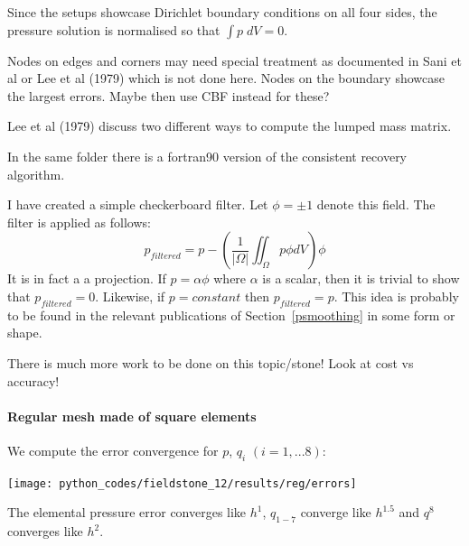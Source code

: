 Since the setups showcase Dirichlet boundary conditions on all four sides, 
the pressure solution is normalised so that $\int p\; dV =0 $.

\begin{remark}
Nodes on edges and corners may need special treatment as documented in Sani et al \cite{sagl81a} or
Lee et al (1979) \cite{legs79} which is not done here.  
Nodes on the boundary showcase the largest errors. Maybe then use CBF instead for these?
\end{remark}

\begin{remark}
Lee et al (1979) \cite{legs79} discuss two different ways to compute the lumped mass matrix. 
\end{remark}

\begin{remark}
In the same folder there is a fortran90 version of the consistent recovery algorithm.
\end{remark}

I have created a simple checkerboard filter. Let $\phi=\pm 1$ denote this field.
The filter is applied as follows:
\[
p_{filtered} = p - \left( \frac{1}{|\Omega|} \iint_\Omega p \phi dV \right) \phi
\]
It is in fact a a projection. If $p=\alpha \phi$  where $\alpha$ is a scalar, then 
it is trivial to show that $p_{filtered} =0$.
Likewise, if $p=constant$ then $p_{filtered}=p$.
This idea is probably to be found in the relevant publications of Section~\ref{psmoothing}
in some form or shape. 

There is much more work to be done on this topic/stone! Look at cost vs accuracy!

\newpage
\paragraph{Regular mesh made of square elements}

We compute the error convergence for $p$, $q_i$ $(i=1,...8)$:
\begin{center}
\texttt{[image: python\_codes/fieldstone\_12/results/reg/errors]}
\end{center}
The elemental pressure error converges like $h^1$, $q_{1-7}$ converge like $h^{1.5}$ and 
$q^8$ converges like $h^2$.


